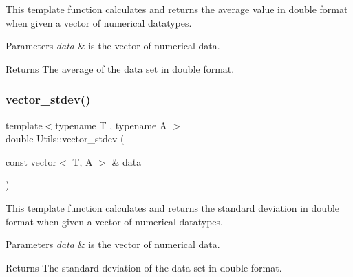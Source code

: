 This template function calculates and returns the average value in double format when given a vector of numerical datatypes. 
\begin{DoxyParams}{Parameters}
{\em data} & is the vector of numerical data. \\
\hline
\end{DoxyParams}
\begin{DoxyReturn}{Returns}
The average of the data set in double format. 
\end{DoxyReturn}
\mbox{\label{namespace_utils_a04daea5e4b4bb28117b09e1abae4ec5c}} 
\subsubsection{\texorpdfstring{vector\+\_\+stdev()}{vector\_stdev()}}
{\footnotesize\ttfamily template$<$typename T , typename A $>$ \\
double Utils\+::vector\+\_\+stdev (\begin{DoxyParamCaption}\item[{const vector$<$ T, A $>$ \&}]{data }\end{DoxyParamCaption})}

This template function calculates and returns the standard deviation in double format when given a vector of numerical datatypes. 
\begin{DoxyParams}{Parameters}
{\em data} & is the vector of numerical data. \\
\hline
\end{DoxyParams}
\begin{DoxyReturn}{Returns}
The standard deviation of the data set in double format. 
\end{DoxyReturn}
